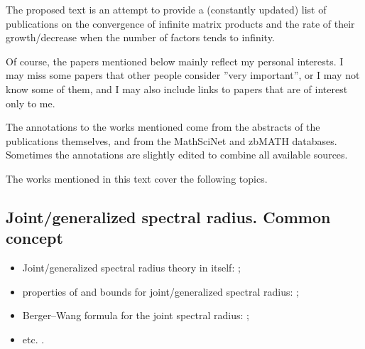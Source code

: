 %
The proposed text is an attempt to provide a (constantly updated) list of publications on the convergence of infinite matrix products and the rate of their growth/decrease when the number of factors tends to infinity.

Of course, the papers mentioned below mainly reflect my personal interests. I may miss some papers that other people consider ''very important'', or I may not know some of them, and I may also include links to papers that are of interest only to me.

The annotations to the works mentioned come from the abstracts of the publications themselves, and from the MathSciNet and zbMATH databases. Sometimes the annotations are slightly edited to combine all available sources.

The works mentioned in this text cover the following topics.

\subsection*{Joint/generalized spectral radius. Common concept}
\begin{itemize}
\item Joint/generalized spectral radius theory in itself: \cite{AhmPar:CDC12, Bar:CDC05, BKPW:LAA08, Blondel:LAA08, Bochi15, Breuillard:ArXiv21, Cicone:ArXiv15, CMS:LAA21, Czornik:LAA05, Els:LAA95, GugZen:LNM14, Jungers:09, Jungers:LNCS13, Morris:LAA17, MorSid:JEMS13, OgurMart:LAA14, PW:LAA08, PWB:CDC05, Prot:FPM96:e, Prot:IZV97:e, Prot:FU98, RotaStr:IM60, ShihWP:LAA97, ShulTur:JFA00, KisShulTur:20, ShulTur:ArXiv08, Strang03, Theys:PhD05, XuXiao:AJIFAC11, MolReif:LAA14, Moller15, MP:DCDCA18};
\item properties of and bounds for joint/generalized spectral radius: \cite{Alpin:MZ10, Breuillard:ArXiv21, CJ:IJAMCS06, CJN:AISC15, Gil:UJMA19, GS:MCRF20, HStr:LASP92, Koz:DEDS10, Koz:LAA10, Maesumi:TIC95, Maesumi:LAA96, Morris:ADVM10, Peperko:LAA12, Wirth:MTNS04, Wirth:LAA05, XuAci:IEEETAC20, Zhou:AMC06};
\item Berger--Wang formula for the joint spectral radius: \cite{BF:ArXiv18, Breuillard:ArXiv21, Koz:LAA14, Morris:JFA12, Oregon-Reyes:JEPM20};
\item etc. \cite{Bui:ArXiv21, GugZen:LAA12, Koz:LAA09, Oreg-Reyes:MastThes18, Pascoe:IJM21}.
\end{itemize}

